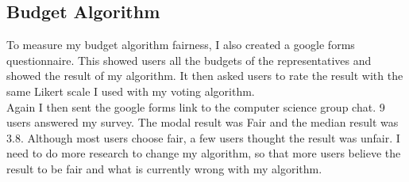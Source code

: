 \subsection{Budget Algorithm}
To measure my budget algorithm fairness, I also created a google forms questionnaire. This showed users all the budgets of the representatives and showed the result of my algorithm. It then asked users to rate the result with the same Likert scale I used with my voting algorithm.  \\
Again I then sent the google forms link to the computer science group chat. 9 users answered my survey. The modal result was Fair and the median result was 3.8. Although most users choose fair, a few users thought the result was unfair. I need to do more research to change my algorithm, so that more users believe the result to be fair and what is currently wrong with my algorithm.
